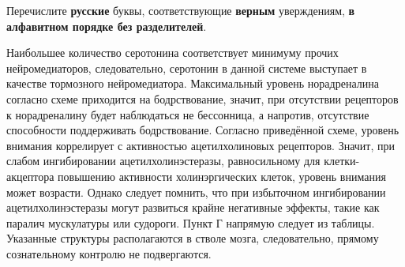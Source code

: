 Перечислите \textbf{русские} буквы, соответствующие \textbf{верным} уверждениям, \textbf{в алфавитном порядке без разделителей}.

\explanationSection

Наибольшее количество серотонина соответствует минимуму прочих нейромедиаторов, следовательно, серотонин в данной системе выступает в качестве тормозного нейромедиатора. Максимальный уровень норадреналина согласно схеме приходится на бодрствование, значит, при отсутствии рецепторов к норадреналину будет наблюдаться не бессонница, а напротив, отсутствие способности поддерживать бодрствование. Согласно приведённой схеме, уровень внимания коррелирует с активностью ацетилхолиновых рецепторов. Значит, при слабом ингибировании ацетилхолинэстеразы, равносильному для клетки-акцептора повышению активности холинэргических клеток, уровень внимания может возрасти. Однако следует помнить, что при избыточном ингибировании ацетилхолинэстеразы могут развиться крайне негативные эффекты, такие как паралич мускулатуры или судороги. Пункт Г напрямую следует из таблицы. Указанные структуры располагаются в стволе мозга, следовательно, прямому сознательному контролю не подвергаются.

